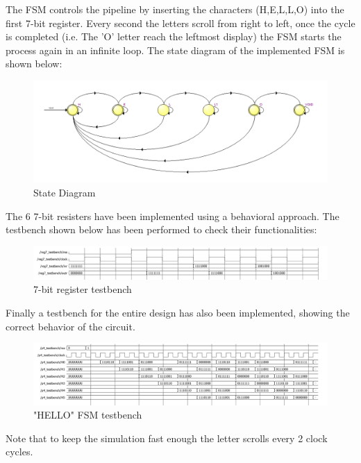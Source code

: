 \documentclass[12pt]{article}
\begin{document}
The FSM controls the pipeline by inserting the characters (H,E,L,L,O) into the first 7-bit register.
Every second the letters scroll  from right to left, once the cycle is completed (i.e. The 'O' letter reach the leftmost display) the FSM starts the process again in an infinite loop.
The state diagram of the implemented FSM is shown below:
\begin{figure}[!h]
	\centering
	\includegraphics[scale = 0.45]{immagini/niki/statemachine.PNG}
	\caption{State Diagram}
\end{figure}
\newpage
The 6 7-bit resisters have been implemented using a behavioral approach. The testbench shown below has been performed to check their functionalities:
\begin{figure}[!h]
	\centering
	\includegraphics[scale = 0.55]{immagini/niki/reg.PNG}
	\caption{7-bit register testbench}
\end{figure}

Finally a testbench for the entire design has also been implemented, showing the correct behavior of the circuit.
\begin{figure}[!h]
	\centering
	\includegraphics[scale = 0.55]{immagini/niki/disp.PNG}
	\caption{"HELLO" FSM testbench}
\end{figure}

Note that to keep the simulation fast enough the letter scrolls every 2 clock cycles.
\end{document}
